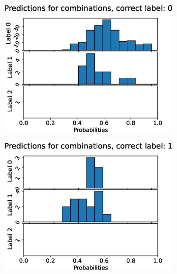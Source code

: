 \begin{figure}
  \centering
  \begin{subfigure}[t]{0.33\textwidth}
    \includegraphics[width=\textwidth]{files/figs/res/kmfp/pc0.eps}
    \caption{}
    \label{fig:kmfp-pc0}
  \end{subfigure}%
  \begin{subfigure}[t]{0.33\textwidth}
    \includegraphics[width=\textwidth]{files/figs/res/kmfp/pc1.eps}
    \caption{}
    \label{fig:kmfp-pc1}
  \end{subfigure}%
  \begin{subfigure}[t]{0.33\textwidth}

\end{subfigure}
\end{figure}
